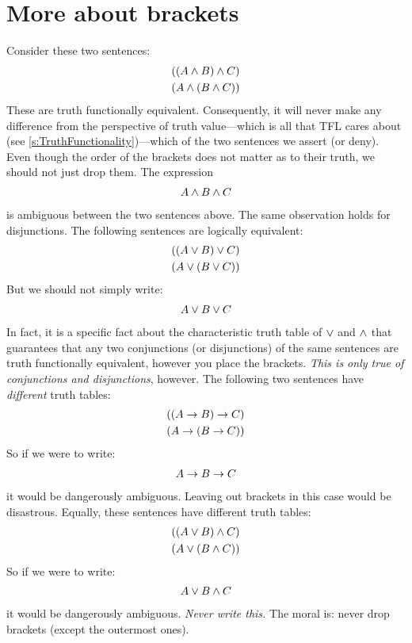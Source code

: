 \section{More about brackets}\label{s:MoreBracketingConventions}
Consider these two sentences:
	\begin{align*}
		((A \wedge B) \wedge C)\\
		(A \wedge (B \wedge C))
	\end{align*}
These are truth functionally equivalent. Consequently, it will never make any difference from the perspective of truth value---which is all that TFL cares about (see \cref{s:TruthFunctionality})---which of the two sentences we assert (or deny). Even though the order of the brackets does not matter as to their truth, we should not just drop them. The expression
	\begin{align*}
		A \wedge B \wedge C
	\end{align*}
is ambiguous between the two sentences above.  The same observation holds for disjunctions. The following sentences are logically equivalent:
	\begin{align*}
		((A \vee B) \vee C)\\
		(A \vee (B \vee C))
	\end{align*}
But we should not simply write:
	\begin{align*}
		A \vee B \vee C
	\end{align*}
In fact, it is a specific fact about the characteristic truth table of $\vee$ and $\wedge$ that guarantees that any two conjunctions (or disjunctions) of the same sentences are truth functionally equivalent, however you place the brackets. \emph{This is only true of conjunctions and disjunctions}, however. The following two sentences have \emph{different} truth tables:
	\begin{align*}
		((A \rightarrow B) \rightarrow C)\\
		(A \rightarrow (B \rightarrow C))
	\end{align*}
So if we were to write:
	\begin{align*}
		A \rightarrow B \rightarrow C
	\end{align*}
it would be dangerously ambiguous. Leaving out brackets in this case would be disastrous. Equally, these sentences have different truth tables:
	\begin{align*}
		((A \vee B) \wedge C)\\
		(A \vee (B \wedge C))
	\end{align*}
So if we were to write:
	\begin{align*}
		A \vee B \wedge C
	\end{align*}
it would be dangerously ambiguous. \emph{Never write this.} The moral is: never drop brackets (except the outermost ones).

